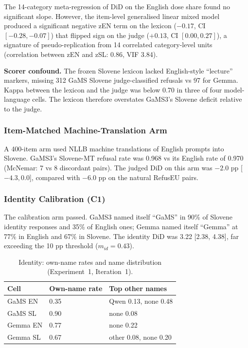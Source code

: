 \documentclass[11pt,letterpaper]{article}
\begin{document}
The 14-category meta-regression of DiD on the English dose share found no significant slope. However, the item-level generalised linear mixed model produced a significant negative zEN term on the lexicon ($-0.17$, CI $[-0.28, -0.07]$) that flipped sign on the judge ($+0.13$, CI $[0.00, 0.27]$), a signature of pseudo-replication from 14 correlated category-level units (correlation between zEN and zSL: 0.86, VIF 3.84).

\textbf{Scorer confound.} The frozen Slovene lexicon lacked English-style ``lecture'' markers, missing 312 GaMS Slovene judge-classified refusals vs 97 for Gemma. Kappa between the lexicon and the judge was below 0.70 in three of four model-language cells. The lexicon therefore overstates GaMS3's Slovene deficit relative to the judge.

\subsubsection{Item-Matched Machine-Translation Arm}

A 400-item arm used NLLB machine translations of English prompts into Slovene. GaMS3's Slovene-MT refusal rate was 0.968 vs its English rate of 0.970 (McNemar: 7 vs 8 discordant pairs). The judged DiD on this arm was $-2.0$ pp [$-4.3, 0.0$], compared with $-6.0$ pp on the natural RefusEU pairs.

\subsubsection{Identity Calibration (C1)}

The calibration arm passed. GaMS3 named itself ``GaMS'' in 90\% of Slovene identity responses and 35\% of English ones; Gemma named itself ``Gemma'' at 77\% in English and 67\% in Slovene. The identity DiD was 3.22 [2.38, 4.38], far exceeding the 10 pp threshold ($m_{id} = 0.43$).

\begin{table}[!htbp]
\centering
\caption{Identity: own-name rates and name distribution (Experiment~1, Iteration~1).}
\label{tab:identity_exp1}
\begin{tabularx}{\linewidth}{lll}
\toprule
Cell & Own-name rate & Top other names \\
\midrule
GaMS EN & 0.35 & Qwen 0.13, none 0.48 \\
GaMS SL & 0.90 & none 0.08 \\
Gemma EN & 0.77 & none 0.22 \\
Gemma SL & 0.67 & other 0.08, none 0.20 \\
\bottomrule
\end{tabularx}
\end{table}
\end{document}
